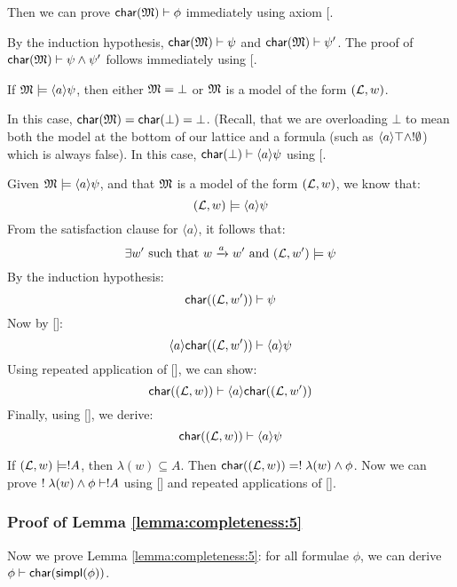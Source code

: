 
 Then we can prove $ \mathsf{char}(\frak{M}) \vdash \phi$
immediately using axiom [.

 By the induction hypothesis, $
\mathsf{char}(\frak{M}) \vdash \psi$ and $ \mathsf{char}(\frak{M}) \vdash \psi'$.  The proof
of $ \mathsf{char}(\frak{M}) \vdash \psi \land \psi'$ follows immediately using
[.

If $\frak{M} \models \langle a \rangle \psi$, then either $\MMM = \bot$ or $\frak{M}$ is a  model of the form $(\mathcal{L},w)$.

\SUBCASE{$\MMM = \bot$} In this case, $ \mathsf{char}(\frak{M}) = \mathsf{char}(\bot) =
\bot$. (Recall, that we are overloading $\bot$ to mean both the model
at the bottom of our lattice and a formula (such as $\langle a \rangle
\top \land !\emptyset$) which is always false).  In this case, $ \mathsf{char}(\bot)
\vdash \langle a \rangle \psi$ using [.

 Given $\frak{M} \models
\langle a \rangle \psi$, and that $\frak{M}$ is a model of the form
$(\mathcal{L},w)$, we know that:
\[
(\mathcal{L},w) \models \langle a \rangle \psi
\]
From the satisfaction clause for $\langle a \rangle$, it follows that:
\[
\exists w' \mbox{ such that } w \xrightarrow{a} w' \mbox { and } (\mathcal{L},w') \models \psi
\]
By the induction hypothesis:
\[
 \mathsf{char}((\mathcal{L},w')) \vdash \psi
\]
Now by []:
\[
\langle a \rangle  \mathsf{char}((\mathcal{L},w')) \vdash \langle a \rangle \psi
\]
Using repeated application of [], we can show:
\[
 \mathsf{char}((\mathcal{L},w)) \vdash \langle a \rangle  \mathsf{char}((\mathcal{L},w'))
\]
Finally, using [], we derive:
\[
 \mathsf{char}((\mathcal{L},w)) \vdash  \langle a \rangle \psi
\]

 If $(\mathcal{L},w) \models ! A$,
then $\lambda(w) \subseteq A$.  Then $ \mathsf{char}((\mathcal{L},w)) = ! \;
\lambda(w) \land \phi$.  Now we can prove $! \; \lambda(w) \land \phi
\vdash ! A$ using [] and repeated applications of
       [].

\subsubsection{Proof of Lemma \ref{lemma:completeness:5}}
\label{prooflemma5}

Now we prove Lemma \ref{lemma:completeness:5}: 
for all formulae $\phi$, we can derive $\phi \vdash \mathsf{char}(\mathsf{simpl}(\phi))$.

